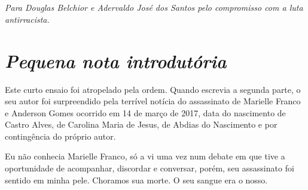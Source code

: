





















\chapter*{}

\emph{Para Douglas Belchior e Adervaldo José dos Santos pelo compromisso
com a luta antirracista.}

\chapter{\emph{Pequena nota introdutória}}

Este curto ensaio foi atropelado pela ordem. Quando escrevia a segunda
parte, o seu autor foi surpreendido pela terrível notícia do assassinato
de Marielle Franco e Anderson Gomes ocorrido em 14 de março de 2017,
data do nascimento de Castro Alves, de Carolina Maria de Jesus, de
Abdias do Nascimento e por contingência do próprio autor.

Eu não conhecia Marielle Franco, só a vi uma vez num debate em que tive
a oportunidade de acompanhar, discordar e conversar, porém, seu
assassinato foi sentido em minha pele. Choramos sua morte. O seu sangue
era o nosso.

